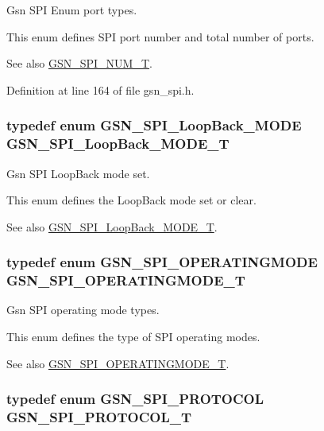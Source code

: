 Gsn SPI Enum port types. 

This enum defines SPI port number and total number of ports. \begin{DoxySeeAlso}{See also}
\hyperlink{a00587_a8158d263babcdfe1b3b113e23acd1bf7}{GSN\_\-SPI\_\-NUM\_\-T}. 
\end{DoxySeeAlso}


Definition at line 164 of file gsn\_\-spi.h.

\hypertarget{a00655_ga6f83091cbd86860cdb531eb6c520660e}{
\subsubsection[{GSN\_\-SPI\_\-LoopBack\_\-MODE\_\-T}]{\setlength{\rightskip}{0pt plus 5cm}typedef enum {\bf GSN\_\-SPI\_\-LoopBack\_\-MODE}  {\bf GSN\_\-SPI\_\-LoopBack\_\-MODE\_\-T}}}
\label{a00655_ga6f83091cbd86860cdb531eb6c520660e}


Gsn SPI LoopBack mode set. 

This enum defines the LoopBack mode set or clear. \begin{DoxySeeAlso}{See also}
\hyperlink{a00655_ga6f83091cbd86860cdb531eb6c520660e}{GSN\_\-SPI\_\-LoopBack\_\-MODE\_\-T}. 
\end{DoxySeeAlso}
\hypertarget{a00655_ga6621383791d81630bc4c294a7a3d292d}{
\subsubsection[{GSN\_\-SPI\_\-OPERATINGMODE\_\-T}]{\setlength{\rightskip}{0pt plus 5cm}typedef enum {\bf GSN\_\-SPI\_\-OPERATINGMODE}  {\bf GSN\_\-SPI\_\-OPERATINGMODE\_\-T}}}
\label{a00655_ga6621383791d81630bc4c294a7a3d292d}


Gsn SPI operating mode types. 

This enum defines the type of SPI operating modes. \begin{DoxySeeAlso}{See also}
\hyperlink{a00655_ga6621383791d81630bc4c294a7a3d292d}{GSN\_\-SPI\_\-OPERATINGMODE\_\-T}. 
\end{DoxySeeAlso}
\hypertarget{a00655_gafc404344d5f8c6a8358fa3be07a87444}{
\subsubsection[{GSN\_\-SPI\_\-PROTOCOL\_\-T}]{\setlength{\rightskip}{0pt plus 5cm}typedef enum {\bf GSN\_\-SPI\_\-PROTOCOL}  {\bf GSN\_\-SPI\_\-PROTOCOL\_\-T}}}
\label{a00655_gafc404344d5f8c6a8358fa3be07a87444}


